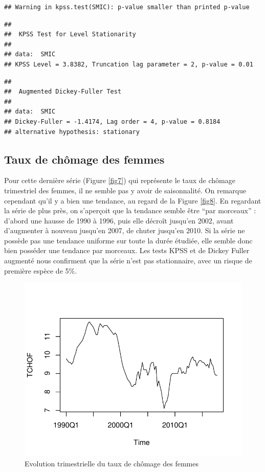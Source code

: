 \documentclass[11pt,]{article}
\begin{document}
\begin{verbatim}
## Warning in kpss.test(SMIC): p-value smaller than printed p-value
\end{verbatim}

\begin{verbatim}
## 
##  KPSS Test for Level Stationarity
## 
## data:  SMIC
## KPSS Level = 3.8382, Truncation lag parameter = 2, p-value = 0.01
\end{verbatim}

\begin{verbatim}
## 
##  Augmented Dickey-Fuller Test
## 
## data:  SMIC
## Dickey-Fuller = -1.4174, Lag order = 4, p-value = 0.8184
## alternative hypothesis: stationary
\end{verbatim}

\subsection{\texorpdfstring{Taux de chômage des femmes
\label{TCHOF}}{Taux de chômage des femmes }}\label{taux-de-chomage-des-femmes}

Pour cette dernière série (Figure \ref{fig7}) qui représente le taux de
chômage trimestriel des femmes, il ne semble pas y avoir de
saisonnalité. On remarque cependant qu'il y a bien une tendance, au
regard de la Figure \ref{fig8}. En regardant la série de plus près, on
s'aperçoit que la tendance semble être ``par morceaux'' : d'abord une
hausse de 1990 à 1996, puis elle décroît jusqu'en 2002, avant
d'augmenter à nouveau jusqu'en 2007, de chuter jusqu'en 2010. Si la
série ne possède pas une tendance uniforme sur toute la durée étudiée,
elle semble donc bien posséder une tendance par morceaux. Les tests KPSS
et de Dickey Fuller augmenté nous confirment que la série n'est pas
stationnaire, avec un risque de première espèce de 5\%.

\begin{figure}

{\centering \includegraphics{doc_files/figure-latex/unnamed-chunk-7-1} 

}

\caption{\label{fig7} Evolution trimestrielle du taux de chômage des femmes}\label{fig:unnamed-chunk-7}
\end{figure}
\end{document}
